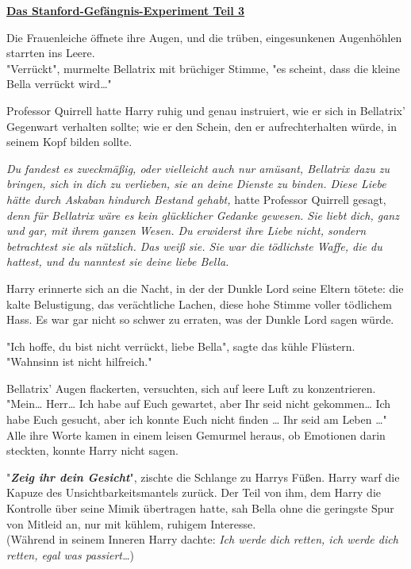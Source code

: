 

\hypertarget{das-stanford-gefuxe4ngnis-experiment-teil-3}{%

\textbf{\uline{Das Stanford-Gefängnis-Experiment Teil 3}}

Die Frauenleiche öffnete ihre Augen, und die trüben, eingesunkenen Augenhöhlen starrten ins Leere.\\ "Verrückt", murmelte Bellatrix mit brüchiger Stimme, "es scheint, dass die kleine Bella verrückt wird…"

Professor Quirrell hatte Harry ruhig und genau instruiert, wie er sich in Bellatrix' Gegenwart verhalten sollte; wie er den Schein, den er aufrechterhalten würde, in seinem Kopf bilden sollte.

\emph{Du fandest es zweckmäßig, oder vielleicht auch nur amüsant, Bellatrix dazu zu bringen, sich in dich zu verlieben, sie an deine Dienste zu binden. Diese Liebe hätte durch Askaban hindurch Bestand gehabt,} hatte Professor Quirrell gesagt, \emph{denn für Bellatrix wäre es kein glücklicher Gedanke gewesen. Sie liebt dich, ganz und gar, mit ihrem ganzen Wesen. Du erwiderst ihre Liebe nicht, sondern betrachtest sie als nützlich. Das weiß sie. Sie war die tödlichste Waffe, die du hattest, und du nanntest sie deine liebe Bella.}

Harry erinnerte sich an die Nacht, in der der Dunkle Lord seine Eltern tötete: die kalte Belustigung, das verächtliche Lachen, diese hohe Stimme voller tödlichem Hass. Es war gar nicht so schwer zu erraten, was der Dunkle Lord sagen würde.

"Ich hoffe, du bist nicht verrückt, liebe Bella", sagte das kühle Flüstern. "Wahnsinn ist nicht hilfreich."

Bellatrix' Augen flackerten, versuchten, sich auf leere Luft zu konzentrieren.\\ "Mein… Herr… Ich habe auf Euch gewartet, aber Ihr seid nicht gekommen… Ich habe Euch gesucht, aber ich konnte Euch nicht finden … Ihr seid am Leben …"\\ Alle ihre Worte kamen in einem leisen Gemurmel heraus, ob Emotionen darin steckten, konnte Harry nicht sagen.

"\textbf{\emph{Zeig ihr dein Gesicht}}", zischte die Schlange zu Harrys Füßen. Harry warf die Kapuze des Unsichtbarkeitsmantels zurück. Der Teil von ihm, dem Harry die Kontrolle über seine Mimik übertragen hatte, sah Bella ohne die geringste Spur von Mitleid an, nur mit kühlem, ruhigem Interesse.\\ (Während in seinem Inneren Harry dachte: \emph{Ich werde dich retten, ich werde dich retten, egal was passiert…})

}
